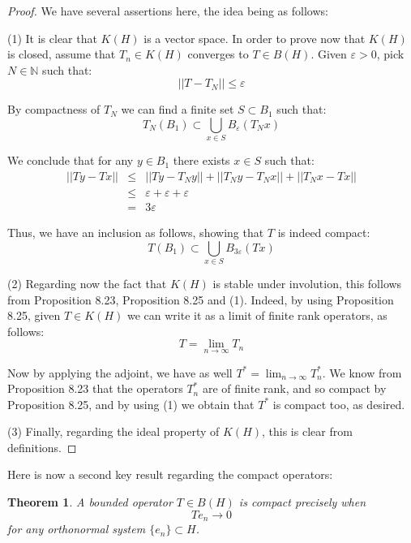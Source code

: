 \documentclass[12pt]{amsbook}
\newtheorem{theorem}{Theorem}[chapter]
\begin{document}
\begin{proof}
We have several assertions here, the idea being as follows:

\medskip

(1) It is clear that $K(H)$ is a vector space. In order to prove now that $K(H)$ is closed, assume that $T_n\in K(H)$ converges to $T\in B(H)$. Given $\varepsilon>0$, pick $N\in\mathbb N$ such that:
$$||T-T_N||\leq\varepsilon$$

By compactness of $T_N$ we can find a finite set $S\subset B_1$ such that:
$$T_N(B_1)\subset\bigcup_{x\in S}B_\varepsilon(T_Nx)$$

We conclude that for any $y\in B_1$ there exists $x\in S$ such that:
\begin{eqnarray*}
||Ty-Tx||
&\leq&||Ty-T_Ny||+||T_Ny-T_Nx||+||T_Nx-Tx||\\
&\leq&\varepsilon+\varepsilon+\varepsilon\\
&=&3\varepsilon
\end{eqnarray*}

Thus, we have an inclusion as follows, showing that $T$ is indeed compact:
$$T(B_1)\subset\bigcup_{x\in S}B_{3\varepsilon}(Tx)$$

(2) Regarding now the fact that $K(H)$ is stable under involution, this follows from Proposition 8.23, Proposition 8.25 and (1). Indeed, by using Proposition 8.25, given $T\in K(H)$ we can write it as a limit of finite rank operators, as follows:
$$T=\lim_{n\to\infty}T_n$$

Now by applying the adjoint, we have as well $T^*=\lim_{n\to\infty}T_n^*$. We know from Proposition 8.23 that the operators $T_n^*$ are of finite rank, and so compact by Proposition 8.25, and by using (1) we obtain that $T^*$ is compact too, as desired.

\medskip

(3) Finally, regarding the ideal property of $K(H)$, this is clear from definitions.
\end{proof}

Here is now a second key result regarding the compact operators:

\begin{theorem}
A bounded operator $T\in B(H)$ is compact precisely when
$$Te_n\to0$$
for any orthonormal system $\{e_n\}\subset H$.
\end{theorem}
\end{document}
